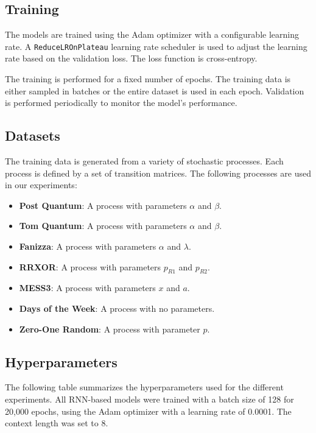\subsection{Training}
The models are trained using the Adam optimizer with a configurable learning rate. A \texttt{ReduceLROnPlateau} learning rate scheduler is used to adjust the learning rate based on the validation loss. The loss function is cross-entropy.

The training is performed for a fixed number of epochs. The training data is either sampled in batches or the entire dataset is used in each epoch. Validation is performed periodically to monitor the model's performance.

\subsection{Datasets}
The training data is generated from a variety of stochastic processes. Each process is defined by a set of transition matrices. The following processes are used in our experiments:
\begin{itemize}
    \item \textbf{Post Quantum}: A process with parameters $\alpha$ and $\beta$.
    \item \textbf{Tom Quantum}: A process with parameters $\alpha$ and $\beta$.
    \item \textbf{Fanizza}: A process with parameters $\alpha$ and $\lambda$.
    \item \textbf{RRXOR}: A process with parameters $p_{R1}$ and $p_{R2}$.
    \item \textbf{MESS3}: A process with parameters $x$ and $a$.
    \item \textbf{Days of the Week}: A process with no parameters.
    \item \textbf{Zero-One Random}: A process with parameter $p$.
\end{itemize}

\subsection{Hyperparameters}
The following table summarizes the hyperparameters used for the different experiments. All RNN-based models were trained with a batch size of 128 for 20,000 epochs, using the Adam optimizer with a learning rate of 0.0001. The context length was set to 8.

